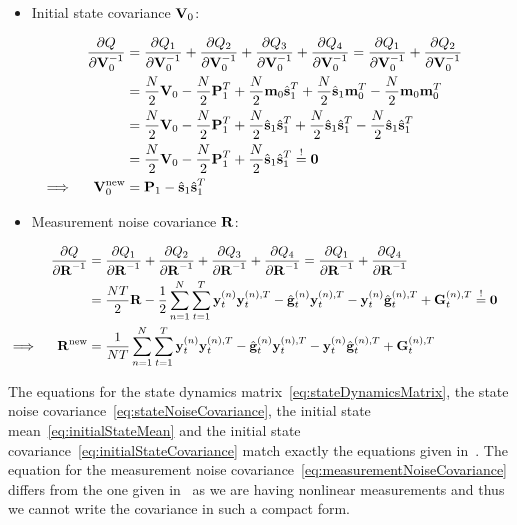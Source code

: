 	\begin{itemize}
		\item Initial state covariance \(\boldsymbol{\mathrm{V}}_0\):
	\end{itemize}
	\begin{align}
		&&\pdv{Q}{\boldsymbol{\mathrm{V}}_0^{-1}}
			&= \pdv{Q_1}{\boldsymbol{\mathrm{V}}_0^{-1}} + \pdv{Q_2}{\boldsymbol{\mathrm{V}}_0^{-1}} + \pdv{Q_3}{\boldsymbol{\mathrm{V}}_0^{-1}} + \pdv{Q_4}{\boldsymbol{\mathrm{V}}_0^{-1}} = \pdv{Q_1}{\boldsymbol{\mathrm{V}}_0^{-1}} + \pdv{Q_2}{\boldsymbol{\mathrm{V}}_0^{-1}} & \nonumber \\
		&&	&= \frac{N}{2} \boldsymbol{\mathrm{V}}_0 - \frac{N}{2} \boldsymbol{\mathrm{P}}_1^T + \frac{N}{2} \boldsymbol{\mathrm{m}}_0 \hat{\boldsymbol{\mathrm{s}}}_1^T + \frac{N}{2} \hat{\boldsymbol{\mathrm{s}}}_1 \boldsymbol{\mathrm{m}}_0^T - \frac{N}{2} \boldsymbol{\mathrm{m}}_0 \boldsymbol{\mathrm{m}}_0^T & \nonumber \\
		&&	&= \frac{N}{2} \boldsymbol{\mathrm{V}}_0 - \frac{N}{2} \boldsymbol{\mathrm{P}}_1^T + \frac{N}{2} \hat{\boldsymbol{\mathrm{s}}}_1 \hat{\boldsymbol{\mathrm{s}}}_1^T + \frac{N}{2} \hat{\boldsymbol{\mathrm{s}}}_1 \hat{\boldsymbol{\mathrm{s}}}_1^T - \frac{N}{2} \hat{\boldsymbol{\mathrm{s}}}_1 \hat{\boldsymbol{\mathrm{s}}}_1^T & \nonumber \\
		&&	&= \frac{N}{2} \boldsymbol{\mathrm{V}}_0 - \frac{N}{2} \boldsymbol{\mathrm{P}}_1^T + \frac{N}{2} \hat{\boldsymbol{\mathrm{s}}}_1 \hat{\boldsymbol{\mathrm{s}}}_1^T \overset{!}{=} \boldsymbol{\mathrm{0}} & \nonumber \\
		\implies && \boldsymbol{\mathrm{V}}_0^{\mathrm{new}} &= \boldsymbol{\mathrm{P}}_1 - \hat{\boldsymbol{\mathrm{s}}}_1 \hat{\boldsymbol{\mathrm{s}}}_1^T & \label{eq:initialStateCovariance}
	\end{align}

	\begin{itemize}
		\item Measurement noise covariance \(\boldsymbol{\mathrm{R}}\):
	\end{itemize}
	\begin{align}
		&&\pdv{Q}{\boldsymbol{\mathrm{R}}^{-1}}
			&= \pdv{Q_1}{\boldsymbol{\mathrm{R}}^{-1}} + \pdv{Q_2}{\boldsymbol{\mathrm{R}}^{-1}} + \pdv{Q_3}{\boldsymbol{\mathrm{R}}^{-1}} + \pdv{Q_4}{\boldsymbol{\mathrm{R}}^{-1}} = \pdv{Q_1}{\boldsymbol{\mathrm{R}}^{-1}} + \pdv{Q_4}{\boldsymbol{\mathrm{R}}^{-1}} & \nonumber \\
		&&	&= \frac{NT}{2} \boldsymbol{\mathrm{R}} - \frac{1}{2} \sum_{n = 1}^{N} \sum_{t = 1}^{T} \boldsymbol{\mathrm{y}}_t^{(n)} \boldsymbol{\mathrm{y}}_t^{(n), T} - \hat{\boldsymbol{\mathrm{g}}}_t^{(n)} \boldsymbol{\mathrm{y}}_t^{(n), T} - \boldsymbol{\mathrm{y}}_t^{(n)} \hat{\boldsymbol{\mathrm{g}}}_t^{(n), T} + \boldsymbol{\mathrm{G}}_t^{(n), T} \overset{!}{=} \boldsymbol{\mathrm{0}} & \nonumber \\
		\implies && \boldsymbol{\mathrm{R}}^{\mathrm{new}} &= \frac{1}{NT} \sum_{n = 1}^{N} \sum_{t = 1}^{T} \boldsymbol{\mathrm{y}}_t^{(n)} \boldsymbol{\mathrm{y}}_t^{(n), T} - \hat{\boldsymbol{\mathrm{g}}}_t^{(n)} \boldsymbol{\mathrm{y}}_t^{(n), T} - \boldsymbol{\mathrm{y}}_t^{(n)} \hat{\boldsymbol{\mathrm{g}}}_t^{(n), T} + \boldsymbol{\mathrm{G}}_t^{(n), T} & \label{eq:measurementNoiseCovariance}
	\end{align}

	The equations for the state dynamics matrix~\eqref{eq:stateDynamicsMatrix}, the state noise covariance~\eqref{eq:stateNoiseCovariance}, the initial state mean~\eqref{eq:initialStateMean} and the initial state covariance~\eqref{eq:initialStateCovariance} match exactly the equations given in~\cite{ghahramaniParameterEstimationLinear1996}. The equation for the measurement noise covariance~\eqref{eq:measurementNoiseCovariance} differs from the one given in~\cite{ghahramaniParameterEstimationLinear1996} as we are having nonlinear measurements and thus we cannot write the covariance in such a compact form.

